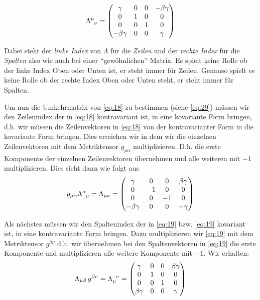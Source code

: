 \begin{equation}
  \label{eq:18}
    \Lambda^\mu_{\hphantom\mu \nu} =
  \begin{pmatrix}
    \gamma&0&0&-\beta\gamma\\
    0&1&0&0\\
    0&0&1&0\\
    -\beta\gamma&0&0&\gamma
  \end{pmatrix}
\end{equation}

Dabei steht der \emph{linke Index} von \(\Lambda\) für die \emph{Zeilen} und
der \emph{rechte Index} für die \emph{Spalten} also wie auch bei einer
``gewöhnlichen'' Matrix. Es spielt keine Rolle ob der linke Index Oben oder
Unten ist, er steht immer für Zeilen. Genauso spielt es keine Rolle ob der rechte
Index Oben oder Unten steht, er steht immer für Spalten.

Um nun die Umkehrmatrix von \eqref{eq:18} zu bestimmen (siehe \eqref{eq:29})
müssen wir den Zeilenindex der in \eqref{eq:18} kontravariant ist, in eine
kovariante Form bringen, d.h. wir müssen die Zeilenvektoren in \eqref{eq:18} von
der kontravarianter Form in die kovariante Form bringen. Dies erreichen wir in
dem wir die einzelnen Zeilenvektoren mit dem Metriktensor \(g_{\mu \alpha}\)
multiplizieren. D.h. die erste Komponente der einzelnen Zeilenvektoren
übernehmen und alle weiteren mit \(-1\) multiplizieren. Dies sieht dann wie
folgt aus
\begin{equation}
  \label{eq:19}
     g_{\mu\alpha}\Lambda^\alpha_{\hphantom\alpha \nu} =
     \Lambda_{\mu \nu} =
  \begin{pmatrix}
    \gamma&0&0&\beta\gamma\\
    0&-1&0&0\\
    0&0&-1&0\\
    -\beta\gamma&0&0&-\gamma
  \end{pmatrix}
\end{equation}

Als nächstes müssen wir den Spaltenindex der in \eqref{eq:19} bzw. \eqref{eq:19} kovariant ist, in
eine kontravariante Form bringen. Dazu multiplizieren wir \eqref{eq:19} mit dem
Metriktensor \(g^{\beta\nu}\) d.h. wir übernehmen bei den Spaltenvektoren in
\eqref{eq:19} die erste Komponente und multiplizieren alle weitere Komponente
mit \(-1\). Wir erhalten:
\begin{equation}
  \label{eq:30}
   \Lambda_{\mu \beta}\,g^{\beta\nu} =  \Lambda_{\mu}^{\hphantom \mu \nu}=
  \begin{pmatrix}
    \gamma&0&0&\beta\gamma\\
    0&1&0&0\\
    0&0&1&0\\
    \beta\gamma&0&0&\gamma
  \end{pmatrix}
\end{equation}

